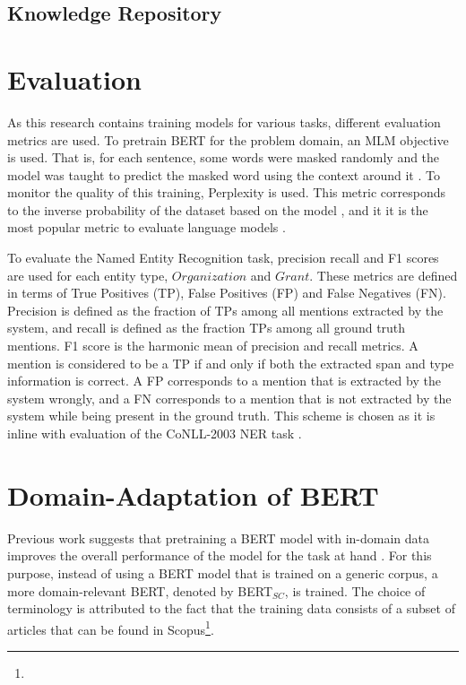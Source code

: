 \documentclass{report}
\theoremstyle{definition}
\theoremstyle{remark}
\begin{document}
\subsection{Knowledge Repository}
\section{Evaluation}
As this research contains training models for various tasks, different evaluation metrics are used. To pretrain BERT for the problem domain, an MLM objective is used. That is, for each sentence, some words were masked randomly and the model was taught to predict the masked word using the context around it \cite{BERT}. To monitor the quality of this training, Perplexity is used. This metric corresponds to the inverse probability of the dataset based on the model \cite{perplexity}, and it it is the most popular metric to evaluate language models \cite{perplexity}. 

To evaluate the Named Entity Recognition task, precision recall and F1 scores are used for each entity type, $Organization$ and $Grant$. These metrics are defined in terms of True Positives (TP), False Positives (FP) and False Negatives (FN). Precision is defined as the fraction of TPs among all mentions extracted by the system, and recall is defined as the fraction TPs among all ground truth mentions. F1 score is the harmonic mean of precision and recall metrics. A mention is considered to be a TP if and only if both the extracted span and type information is correct. A FP corresponds to a mention that is extracted by the system wrongly, and a FN corresponds to a mention that is not extracted by the system while being present in the ground truth. This scheme is chosen as it is inline with evaluation of the CoNLL-2003 NER task \cite{conll}.


\section{Domain-Adaptation of BERT}
\label{sec:exSetPretrain}
Previous work suggests that pretraining a BERT model with in-domain data improves the overall performance of the model for the task at hand \textcolor{red}{\cite{}}. For this purpose, instead of using a BERT model that is trained on a generic corpus, a more domain-relevant BERT, denoted by BERT$_{SC}$, is trained. The choice of terminology is attributed to the fact that the training data consists of a subset of articles that can be found in Scopus\textcolor{red}{\footnote{}}.
\end{document}
